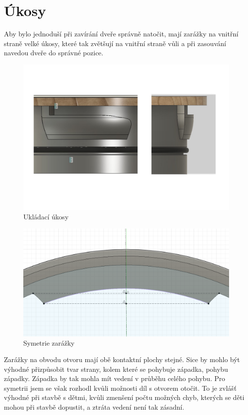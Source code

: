 {\tiny }\section{Úkosy}

Aby bylo jednoduší při zavírání dveře správně natočit, mají zarážky na vnitřní straně velké úkosy, které tak zvětšují na vnitřní straně 
vůli a při zasouvání navedou dveře do správné pozice.

\begin{figure}[h]  
    \centering
    \includegraphics[width=1.2\textwidth]{kapitoly/obrazky/E4/ukozy/ukladaci_ukosy.pdf}
    \caption{Ukládací úkosy}
    \label{fig:E4-ukosy}
\end{figure}
\newpage
\begin{figure}[h]
    \centering
    \includegraphics[width=1.1\textwidth]{kapitoly/obrazky/E4/ukozy/simetrie_zarazek.png}
    \caption{Symetrie zarážky}
    \label{fig:E4-simetrie_zarazky}
\end{figure}
Zarážky na obvodu otvoru mají obě kontaktní plochy stejné. Sice by mohlo být výhodné přizpůsobit tvar strany, kolem které se pohybuje západka, 
pohybu západky. Západka by tak mohla mít vedení v průběhu celého pohybu. Pro symetrii jsem se však rozhodl kvůli možnosti díl s otvorem otočit.
To je zvlášť výhodné při stavbě s dětmi, kvůli zmenšení počtu možných chyb, kterých se děti mohou při stavbě dopustit, a ztráta vedení není tak zásadní.